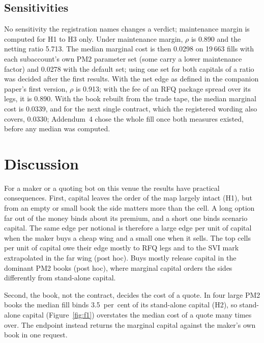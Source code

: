\documentclass[a4paper,fleqn]{cas-dc}
\begin{document}
\subsection{Sensitivities}
No sensitivity the registration names changes a verdict; maintenance margin is computed for H1 to H3 only. Under maintenance margin, $\rho$
is 0.890 and the netting ratio 5.713. The median marginal cost is then 0.0298 on 19\,663 fills with each
subaccount's own PM2 parameter set (some carry a lower maintenance factor) and 0.0278 with the default set; using
one set for both capitals of a ratio was decided after the first results. With the net edge as defined in the
companion paper's first version, $\rho$ is 0.913; with the fee of an RFQ package spread over its legs, it is
0.890. With the book rebuilt from the trade tape, the median marginal cost is 0.0339, and for the next single
contract, which the registered wording also covers, 0.0330; Addendum~4 chose the whole fill once both measures
existed, before any median was computed.

\section{Discussion}\label{sec:discussion}
For a maker or a quoting bot on this venue the results have practical consequences. First, capital leaves the
order of the map largely intact (H1), but from an empty or small book the side matters more than the cell. A
long option far out of the money binds about its premium, and a short one binds scenario capital. The same
edge per notional is therefore a large edge per unit of capital when the maker buys a cheap wing and a small
one when it sells. The top cells per unit of capital owe their edge mostly to RFQ legs and to the SVI mark
extrapolated in the far wing (post hoc). Buys mostly release capital in the dominant PM2 books (post hoc), where
marginal capital orders the sides differently from stand-alone capital.

Second, the book, not the contract, decides the cost of a quote. In four large PM2 books the median fill binds
3.5~per~cent of its stand-alone capital (H2), so stand-alone capital (Figure~\ref{fig:f1}) overstates the
median cost of a quote many times over. The endpoint instead returns the marginal capital
against the maker's own book in one request.
\end{document}
